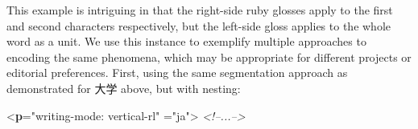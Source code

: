  This example is intriguing in that the right-side ruby glosses apply to the first and second characters respectively, but the left-side gloss applies to the whole word as a unit. We use this instance to exemplify multiple approaches to encoding the same phenomena, which may be appropriate for different projects or editorial preferences. First, using the same segmentation approach as demonstrated for {\textJapanese 大学} above, but with nesting: \par\bgroup{}\exampleFont \begin{shaded}\noindent\mbox{}{<\textbf{p}\hspace*{1em}{style}="{writing-mode: vertical-rl}"\mbox{}\newline 
\hspace*{1em}{xml:lang}="{ja}">}\mbox{}\newline 
\textit{<!--{\textJapanese ...}-->}\mbox{}\newline 
{}\mbox{}\newline 
\hspace*{1em}\mbox{}\newline 
\hspace*{1em}\hspace*{1em}\mbox{}\newline 
\hspace*{1em}\hspace*{1em}\hspace*{1em}\mbox{}\newline 
\hspace*{1em}\hspace*{1em}\hspace*{1em}\mbox{}\newline 

\end{shaded}
